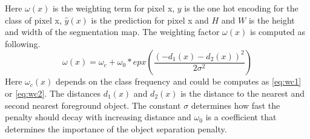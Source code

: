 \documentclass{kththesis}
\begin{document}
Here $\omega(x)$ is the weighting term for pixel x, $y$ is the one hot encoding for the class of pixel x, $\hat{y}(x)$ is the prediction for pixel x and $H$ and $W$ is the height and width of the segmentation map. The weighting factor $\omega(x)$ is computed as following.
\begin{equation}\label{eq:weight}
\omega(x)=\omega_c+\omega_0*epx(\frac{(-d_1(x)-d_2(x))^{2}}{2\sigma^2})
\end{equation}
Here $\omega_c(x)$ depends on the class frequency and could be computes as \ref{eq:wc1} or \ref{eq:wc2}. The distances $d_1(x)$ and $d_2(x)$ is the distance to the nearest and second nearest foreground object. The constant $\sigma$ determines how fast the penalty should decay with increasing distance and $\omega_0$ is a coefficient that determines the importance of the object separation penalty.
\end{document}
